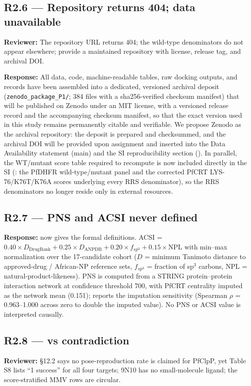 \documentclass[11pt]{article}
\begin{document}
\subsection*{R2.6 --- Repository returns 404; data unavailable}
\textbf{Reviewer:} The repository URL returns 404; the wild-type denominators do not appear
elsewhere; provide a maintained repository with license, release tag, and archival DOI.

\textbf{Response:} All data, code, machine-readable tables, raw docking outputs, and
records have been assembled into a dedicated, versioned archival deposit
(\texttt{zenodo\_package\_P1/}; 384 files with a sha256-verified checksum manifest) that
will be published on Zenodo under an MIT license, with a versioned release record and the
accompanying checksum manifest, so that the exact version used in this study remains
permanently citable and verifiable. We propose Zenodo as the archival repository: the deposit
is prepared and checksummed, and the archival DOI will be provided upon assignment and
inserted into the Data Availability statement (main) and the SI reproducibility section
(). In parallel, the WT/mutant score table required to
recompute  is now included directly in the SI (: the
PfDHFR wild-type/mutant panel and the corrected PfCRT LYS-76/K76T/K76A scores underlying
every RRS denominator), so the RRS denominators no longer reside only in external resources.

\subsection*{R2.7 --- PNS and ACSI never defined}
\textbf{Response:}  now gives the formal definitions. ACSI =
$0.40\times D_{\mathrm{DrugBank}} + 0.25\times D_{\mathrm{ANPDB}} + 0.20\times f_{sp^3}
+ 0.15\times \mathrm{NPL}$ with min--max normalization over the 17-candidate cohort
($D$ = minimum Tanimoto distance to approved-drug / African-NP reference sets, $f_{sp^3}$ =
fraction of sp$^3$ carbons, NPL = natural-product-likeness). PNS is computed from a STRING
protein--protein interaction network at confidence threshold 700, with PfCRT centrality imputed
as the network mean (0.151);  reports the imputation sensitivity (Spearman
$\rho$ = 0.963--1.000 across zero to double the imputed value). No PNS or ACSI value is
interpreted causally.

\subsection*{R2.8 ---  vs  contradiction}
\textbf{Reviewer:} \S12.2 says no pose-reproduction rate is claimed for PfClpP, yet Table S8
lists ``1 success'' for all four targets; 9N10 has no small-molecule ligand; the score-stratified
MMV rows are circular.
\end{document}
